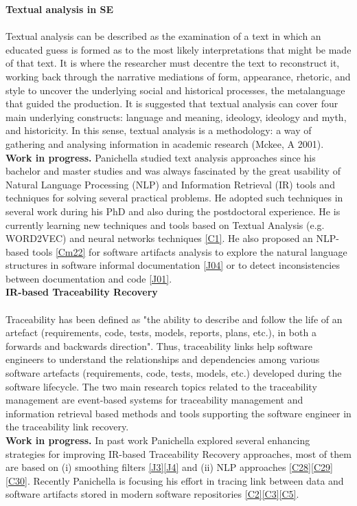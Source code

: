 \documentclass[10pt]{article}
\newcommand{\blankline}{\quad\pagebreak[3]}
\begin{document}
\textbf{Textual analysis in SE}
\blankline\\\\
Textual analysis can be described as the examination of a text in which an educated guess is formed as to the most likely interpretations that might be made of that text. It is where the researcher must decentre the text to reconstruct it, working back through the narrative mediations of form, appearance, rhetoric, and style to uncover the underlying social and historical processes, the metalanguage that guided the production. It is suggested that textual analysis can cover four main underlying constructs: language and meaning, ideology, ideology and myth, and historicity. In this sense, textual analysis is a methodology: a way of gathering and analysing information in academic research (Mckee, A 2001).
\textbf{Work in progress.} Panichella  studied text analysis approaches since his bachelor
and master studies and was always fascinated by the great usability of Natural Language
Processing (NLP) and Information Retrieval (IR) tools and techniques for solving several
practical problems. He adopted such techniques in several work during his PhD and also
during the postdoctoral experience. He is currently learning new techniques and tools
based on Textual Analysis      (e.g. WORD2VEC) and neural networks techniques \ref{C1}. He 
also proposed an NLP-based tools \ref{Cm22} for software artifacts analysis to explore the natural language structures in software informal documentation \ref{J04} or to detect inconsistencies between documentation and code \ref{J01}.\\
   
   \textbf{IR-based Traceability Recovery}
\blankline\\\\
Traceability has been defined as "the ability to describe and follow the life of an artefact (requirements, code, tests, models, reports, plans, etc.), in both a forwards and backwards direction". Thus, traceability links help software engineers to understand the relationships and dependencies among various software artefacts (requirements, code, tests, models, etc.) developed during the software lifecycle. The two main research topics related to the traceability management are event-based systems for traceability management and information retrieval based methods and tools supporting the software engineer in the traceability link recovery.\\
   \textbf{Work in progress.} In past work Panichella explored several enhancing strategies for improving IR-based Traceability Recovery approaches, most of them are based on (i) smoothing filters  \ref{J3}\ref{J4} and (ii)  NLP approaches \ref{C28}\ref{C29}\ref{C30}. Recently Panichella is focusing his effort in tracing link between data and software artifacts stored in modern software repositories \ref{C2}\ref{C3}\ref{C5}.
   \\
\end{document}
